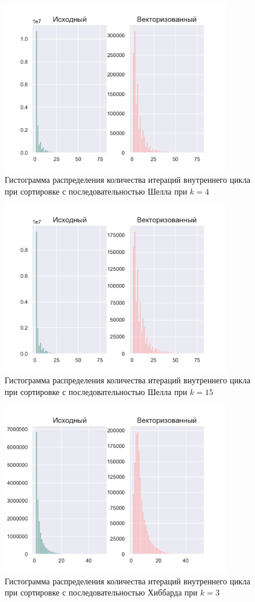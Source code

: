 \documentclass[utf8]{psta}
\begin{document}
\begin{figure}
\includegraphics[width=10cm]{pics/pic_shell_k_4}
\caption{Гистограмма распределения количества итераций внутреннего цикла при сортировке с последовательностью Шелла при $k = 4$}
\label{pic:shell_k_4}
\end{figure}

\begin{figure}
\includegraphics[width=10cm]{pics/pic_shell_k_15}
\caption{Гистограмма распределения количества итераций внутреннего цикла при сортировке с последовательностью Шелла при $k = 15$}
\label{pic:shell_k_15}
\end{figure}

\begin{figure}
\includegraphics[width=10cm]{pics/pic_hibbard_k_3}
\caption{Гистограмма распределения количества итераций внутреннего цикла при сортировке с последовательностью Хиббарда при $k = 3$}
\label{pic:hibbard_k_3}
\end{figure}
\end{document}

